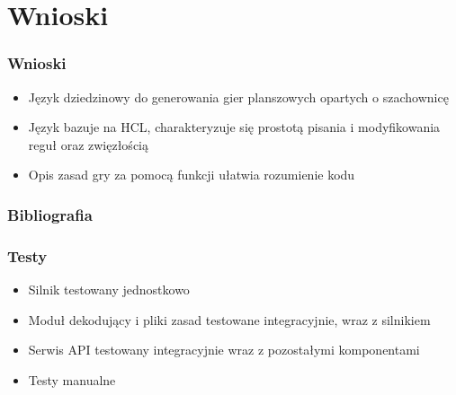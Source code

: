 \documentclass{beamer}
\begin{document}
\section{Wnioski}

\begin{frame}
	\frametitle{Wnioski}

	\begin{itemize}
		\item Język dziedzinowy do generowania gier planszowych opartych o szachownicę
		\item Język bazuje na HCL, charakteryzuje się prostotą pisania i modyfikowania reguł oraz zwięzłością
		\item Opis zasad gry za pomocą funkcji ułatwia rozumienie kodu
	\end{itemize}
\end{frame}

\begin{frame}
	\frametitle{Bibliografia}
	\nocite{*} %
	\printbibliography[heading=none]
\end{frame}


\begin{frame}[noframenumbering]
	\frametitle{Testy}
	\begin{itemize}
		\item Silnik testowany jednostkowo
		\item Moduł dekodujący i pliki zasad testowane integracyjnie, wraz z silnikiem
		\item Serwis API testowany integracyjnie wraz z pozostałymi komponentami
		\item Testy manualne
	\end{itemize}
\end{frame}
\end{document}
